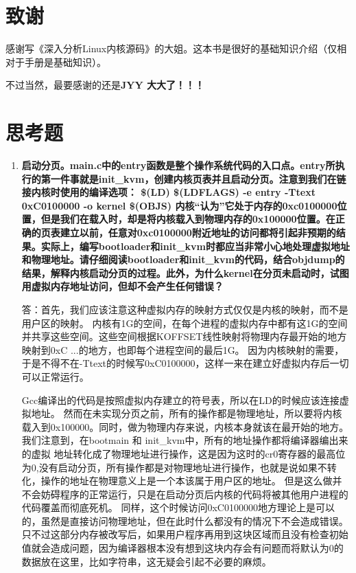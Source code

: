 \documentclass[11pt]{article}
\begin{document}
    
\section{致谢}
    感谢写《深入分析Linux内核源码》的大姐。这本书是很好的基础知识介绍（仅相对于手册是基础知识）。
    
    不过当然，最要感谢的还是\bf JYY \rm 大大了！！！


\section{思考题}
\begin{enumerate}
	\item \bf
启动分页。main.c中的entry函数是整个操作系统代码的入口点。entry所执行的第一件事就是init\_kvm，创建内核页表并且启动分页。注意到我们在链接内核时使用的编译选项：
\$(LD) \$(LDFLAGS) -e entry -Ttext 0xC0100000 -o kernel \$(OBJS)
内核“认为”它处于内存的0xc0100000位置，但是我们在载入时，却是将内核载入到物理内存的0x100000位置。在正确的页表建立以前，任意对0xc0100000附近地址的访问都将引起非预期的结果。实际上，编写bootloader和init\_kvm时都应当非常小心地处理虚拟地址和物理地址。请仔细阅读bootloader和init\_kvm的代码，结合objdump的结果，解释内核启动分页的过程。此外，为什么kernel在分页未启动时，试图用虚拟内存地址访问，但却不会产生任何错误？ \rm

答：首先，我们应该注意这种虚拟内存的映射方式仅仅是内核的映射，而不是用户区的映射。
内核有1G的空间，在每个进程的虚拟内存中都有这1G的空间并共享这些空间。这些空间根据KOFFSET线性映射将物理内存最开始的地方映射到0xC ...的地方，也即每个进程空间的最后1G。
因为内核映射的需要，于是不得不在-Ttext的时候写0xC0100000，这样一来在建立好虚拟内存后一切可以正常运行。

Gcc编译出的代码是按照虚拟内存建立的符号表，所以在LD的时候应该连接虚拟地址。
然而在未实现分页之前，所有的操作都是物理地址，所以要将内核载入到0x100000。同时，做为物理内存来说，内核本身就该在最开始的地方。
我们注意到，在bootmain 和 init\_kvm中，所有的地址操作都将编译器编出来的虚拟
地址转化成了物理地址进行操作，这是因为这时的cr0寄存器的最高位为0,没有启动分页，所有操作都是对物理地址进行操作，也就是说如果不转化，操作的地址在物理意义上是一个本该属于用户区的地址。
但是这么做并不会妨碍程序的正常运行，只是在启动分页后内核的代码将被其他用户进程的代码覆盖而彻底死机。
同样，这个时候访问0xC0100000地方理论上是可以的，虽然是直接访问物理地址，但在此时什么都没有的情况下不会造成错误。只不过这部分内存被改写后，如果用户程序再用到这块区域而且没有检查初始值就会造成问题，因为编译器根本没有想到这块内存会有问题而将默认为0的数据放在这里，比如字符串，这无疑会引起不必要的麻烦。


\end{enumerate}
\end{document}
